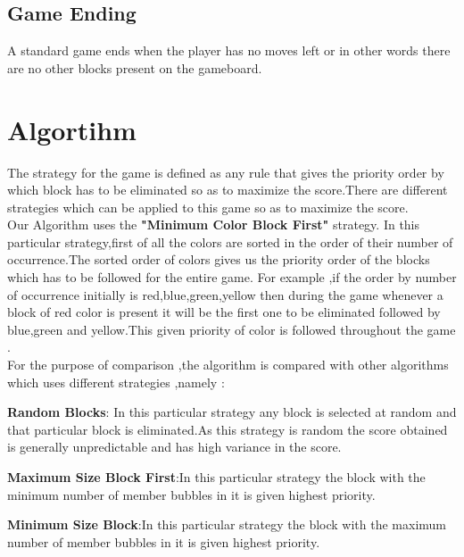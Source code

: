 \documentclass[twoside]{article}
\begin{document}
\begin{multicols}{2}
\subsection{Game Ending }
A standard game ends when the player has no moves left or in other words there are no other blocks present on the gameboard.
\\



\section{Algortihm}
The strategy for the game  is defined as any rule that gives the priority order  by which  block has  to be eliminated so as to maximize the score.There are different strategies which can be applied to this game so as to maximize the score.\\
Our Algorithm uses the \textbf{"Minimum Color Block First"} strategy. In this particular strategy,first of all the colors are sorted in the order of their number of occurrence.The sorted order of colors gives us the priority order of the blocks which has to be followed for the entire game. For example ,if the order by number of occurrence initially is red,blue,green,yellow then during the game whenever a block of red color is present it will be the first one to be eliminated followed by blue,green and yellow.This given priority of color is followed throughout the game .\\
For the purpose of comparison ,the algorithm is compared with other algorithms which uses different strategies ,namely :
\begin{compactitem}
\item \textbf{Random Blocks}: In this particular strategy any block is selected at random and that particular block is eliminated.As this strategy is random the score obtained is generally unpredictable and has high variance in the score.\\
\item \textbf{Maximum Size Block First}:In this particular strategy the block with the minimum number of member bubbles in it is given highest priority.
\item\textbf{ Minimum Size Block}:In this particular strategy the block with the maximum number of member bubbles in it is given highest priority.
\end{compactitem}



\end{multicols}
\end{document}
